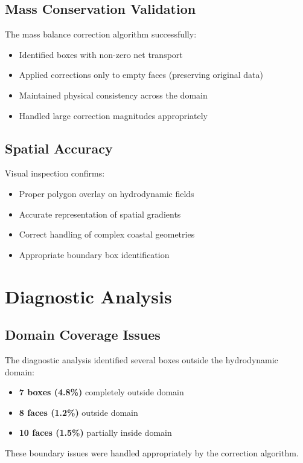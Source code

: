\documentclass[12pt,a4paper,twoside,times,sky,formal]{csiroreport2017}
\begin{document}
\subsection{Mass Conservation Validation}

The mass balance correction algorithm successfully:
\begin{itemize}
\item Identified boxes with non-zero net transport
\item Applied corrections only to empty faces (preserving original data)
\item Maintained physical consistency across the domain
\item Handled large correction magnitudes appropriately
\end{itemize}

\subsection{Spatial Accuracy}

Visual inspection confirms:
\begin{itemize}
\item Proper polygon overlay on hydrodynamic fields
\item Accurate representation of spatial gradients
\item Correct handling of complex coastal geometries
\item Appropriate boundary box identification
\end{itemize}

\section{Diagnostic Analysis}

\subsection{Domain Coverage Issues}

The diagnostic analysis identified several boxes outside the hydrodynamic domain:
\begin{itemize}
\item \textbf{7 boxes (4.8\%)} completely outside domain
\item \textbf{8 faces (1.2\%)} outside domain
\item \textbf{10 faces (1.5\%)} partially inside domain
\end{itemize}

These boundary issues were handled appropriately by the correction algorithm.
\end{document}
